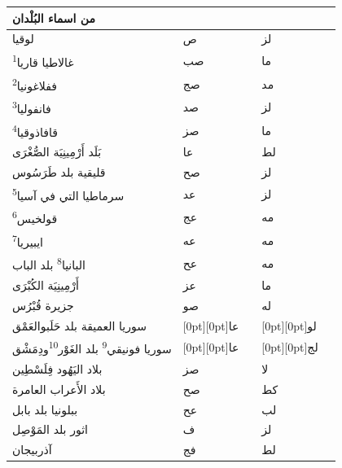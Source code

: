 \documentclass[11pt]{article}
\begin{document}
\begin{Arabic}
\noindent\begin{minipage}[t]{0.495\textwidth}\setlength{\tabcolsep}{2.2pt}\begin{tabular}{|p{55mm}|>{\centering\arraybackslash}p{4.8mm}>{\centering\arraybackslash}p{4.8mm}|>{\centering\arraybackslash}p{4.8mm}>{\centering\arraybackslash}p{4.8mm}|}\hline
\centering من اسماء البُلْدان & \multicolumn{2}{c|}{الطول} & \multicolumn{2}{c|}{العرض} \\ \hline
{}لوقيا & ص &  & لز &  \\
{}غالاطيا قاريا\textsuperscript{1} & صب &  & ما &  \\
{}ففلاغونيا\textsuperscript{2} & صج &  & مد &  \\
{}فانفوليا\textsuperscript{3} & صد &  & لز &  \\
{}قافاذوقيا\textsuperscript{4} & صز &  & ما &  \\
{}بَلَد أَرْمِينِيَة الصُّغْرَى & عا &  & لط &  \\
{}قليقية بلد طَرَسُوس & صح &  & لز &  \\
{}سرماطيا التي في آسيا\textsuperscript{5} & عد &  & لز &  \\
{}قولخيس\textsuperscript{6} & عج &  & مه &  \\
{}ايبيريا\textsuperscript{7} & عه &  & مه &  \\
{}البانيا\textsuperscript{8} بلد الباب & عح &  & مه &  \\
{}أَرْمِينِيَة الكُبْرَى & عز &  & ما &  \\
{}جزيرة قُبْرُس & صو &  & له &  \\
{}سوريا العميقة بلد حَلَب\newline والعَمْق & \raisebox{-1\normalbaselineskip}[0pt][0pt]{عا} &  & \raisebox{-1\normalbaselineskip}[0pt][0pt]{لو} &  \\
{}سوريا فونيقي\textsuperscript{9} بلد الغَوْر\textsuperscript{10}\newline ودِمَشْق & \raisebox{-1\normalbaselineskip}[0pt][0pt]{عا} &  & \raisebox{-1\normalbaselineskip}[0pt][0pt]{لج} &  \\
{}بلاد اليَهُود فِلَسْطِين & صز &  & لا &  \\
{}بلاد الأَعراب العامرة & صح &  & كط &  \\
{}ببلونيا بلد بابل & عح &  & لب &  \\
{}اثور بلد المَوْصِل & ف &  & لز &  \\
{}آذربيجان & فج &  & لط &  \\
\hline\end{tabular}\end{minipage}\hfill\begin{minipage}[t]{0.495\textwidth}\setlength{\tabcolsep}{2.2pt}\begin{tabular}{|p{55mm}|>{\centering\arraybackslash}p{4.8mm}>{\centering\arraybackslash}p{4.8mm}|>{\centering\arraybackslash}p{4.8mm}>{\centering\arraybackslash}p{4.8mm}|}\hline

\end{tabular}
\end{minipage}
\end{Arabic}
\end{document}
